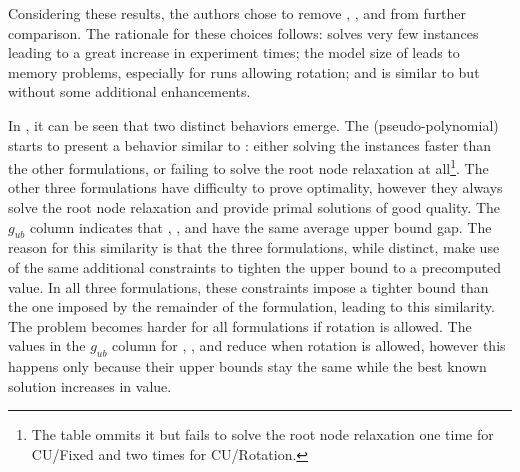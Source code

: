 Considering these results, the authors chose to remove {\modelBCE}, {\modelGrid}, and {\modelFMT} from further comparison.
The rationale for these choices follows: {\modelBCE} solves very few instances leading to a great increase in experiment times; the model size of {\modelGrid} leads to memory problems, especially for runs allowing rotation; and {\modelFMT} is similar to {\modelBecker} but without some additional enhancements.

In , it can be seen that two distinct behaviors emerge.
The {\modelBecker} (pseudo-polynomial) starts to present a behavior similar to {\modelFMT}: either solving the instances faster than the other formulations, or failing to solve the root node relaxation at all\footnote{The table ommits it but {\modelBecker} fails to solve the root node relaxation one time for CU/Fixed and two times for CU/Rotation.}.
The other three formulations have difficulty to prove optimality, however they always solve the root node relaxation and provide primal solutions of good quality.
The \(g_{ub}\) column indicates that {\modelHierarchical}, {\modelImplicit}, and {\modelOrigami} have the same average upper bound gap.
The reason for this similarity is that the three formulations, while distinct, make use of the same additional constraints to tighten the upper bound to a precomputed value.
In all three formulations, these constraints impose a tighter bound than the one imposed by the remainder of the formulation, leading to this similarity.
The problem becomes harder for all formulations if rotation is allowed.
The values in the \(g_{ub}\) column for {\modelHierarchical}, {\modelImplicit}, and {\modelOrigami} reduce when rotation is allowed, however this happens only because their upper bounds stay the same while the best known solution increases in value.

